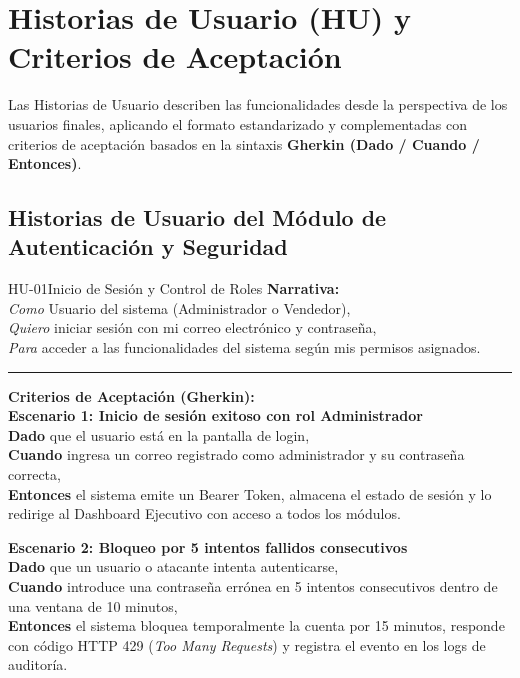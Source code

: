 
\section{Historias de Usuario (HU) y Criterios de Aceptación}

Las Historias de Usuario describen las funcionalidades desde la perspectiva de los usuarios finales, aplicando el formato estandarizado y complementadas con criterios de aceptación basados en la sintaxis \textbf{Gherkin (Dado / Cuando / Entonces)}.

\subsection{Historias de Usuario del Módulo de Autenticación y Seguridad}

\begin{hubox}{HU-01}{Inicio de Sesión y Control de Roles}
\textbf{Narrativa:}\\
\textit{Como} Usuario del sistema (Administrador o Vendedor),\\
\textit{Quiero} iniciar sesión con mi correo electrónico y contraseña,\\
\textit{Para} acceder a las funcionalidades del sistema según mis permisos asignados.

\vspace{0.25cm}\hrule\vspace{0.25cm}
\textbf{Criterios de Aceptación (Gherkin):}\\
\textbf{Escenario 1: Inicio de sesión exitoso con rol Administrador}\\
\textbf{Dado} que el usuario está en la pantalla de login,\\
\textbf{Cuando} ingresa un correo registrado como administrador y su contraseña correcta,\\
\textbf{Entonces} el sistema emite un Bearer Token, almacena el estado de sesión y lo redirige al Dashboard Ejecutivo con acceso a todos los módulos.

\vspace{0.2cm}
\textbf{Escenario 2: Bloqueo por 5 intentos fallidos consecutivos}\\
\textbf{Dado} que un usuario o atacante intenta autenticarse,\\
\textbf{Cuando} introduce una contraseña errónea en 5 intentos consecutivos dentro de una ventana de 10 minutos,\\
\textbf{Entonces} el sistema bloquea temporalmente la cuenta por 15 minutos, responde con código HTTP 429 (\textit{Too Many Requests}) y registra el evento en los logs de auditoría.
\end{hubox}

